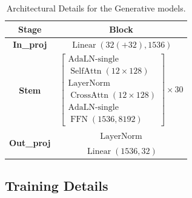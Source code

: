 \documentclass[10pt,twocolumn,letterpaper]{article}
\begin{document}
\begin{table}
    \centering  
    \scriptsize
    \caption{Architectural Details for the Generative models.}  
    \vspace{-8pt}
	\begin{tabular}{c|c}  
        \toprule
        \textbf{Stage} & \textbf{Block} \\
        \midrule  
            \textbf{In\_proj} & $\operatorname{Linear}(32(+32), 1536)$ \\
        \midrule  
            \textbf{Stem} & $\left[\begin{matrix}\operatorname{AdaLN-single}\\\operatorname{SelfAttn}( 12\times128)\\\operatorname{LayerNorm}\\\operatorname{CrossAttn}(12\times128)\\\operatorname{AdaLN-single}\\\operatorname{FFN}(1536,8192)\end{matrix}\right]\times30$  \\
        \midrule  
            \multirow{2}{*}{\textbf{Out\_proj}} & $\operatorname{LayerNorm}$ \\
            & $\operatorname{Linear}(1536, 32)$ \\
        \bottomrule
    \end{tabular}  
    \label{tab:dit_detail} 
\end{table}

\subsection{Training Details}
\end{document}
